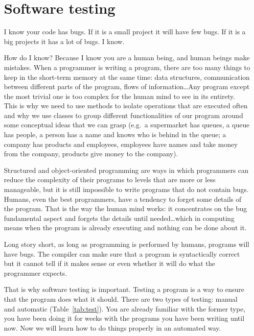 
\section{Software testing}
\label{sec:software-testing}

I know your code has bugs. If it is a small project it will have few
bugs. If it is a big projects it has a lot of bugs. I know.

How do I know? Because I know you are a human being, and human beings
make mistakes. When a programmer is writing a program, there are too
many things to keep in the short-term memory at the same time: data
structures, communication between different parts of the program,
flows of information\ldots Any program except the most trivial one is
too complex for the human mind to see in its entirety. This is why we
need to use methods to isolate operations that are executed often and
why we use classes to group different functionalities of our program
around some conceptual ideas that we can grasp (e.g.~a supermarket has
queues, a queue has people, a person has a name and knows who is
behind in the queue; a company has products and employees, employees
have names and take money from the company, products give money to the
company). 

Structured and object-oriented programming are ways in which
programmers can reduce the complexity of their programs to levels that
are more or less manageable, but it is still impossible to write
programs that do not contain bugs. Humans, even the best programmers,
have a tendency to forget some details of the program. That is the way
the human mind works: it concentrates on the bug fundamental aspect
and forgets the details until needed\ldots which in computing means
when the program is already executing and nothing can be done about
it. 

Long story short, as long as programming is performed by humans,
programs will have bugs. The compiler can make sure that a program is
syntactically correct but it cannot tell if  it makes sense or
even whether it will do what the programmer expects. 

That is why software testing is important. Testing a program is a way
to ensure that the program does what it should. There are two types of
testing: manual and automatic (Table~\ref{tab:test}). You are already
familiar with the former type, you have been doing it for weeks with
the programs you have been writing until now. Now we will learn how to
do things properly in an automated way. 

